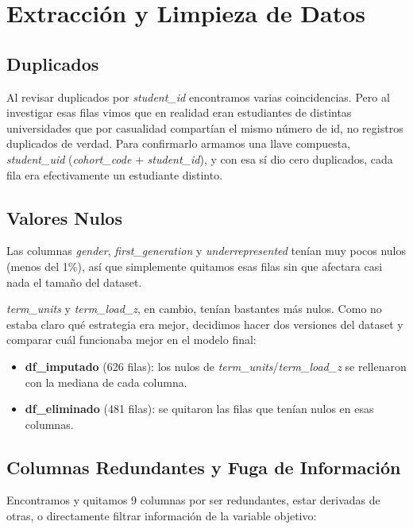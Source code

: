 \documentclass[10pt,twocolumn]{article}
\begin{document}
\section{Extracción y Limpieza de Datos}

\subsection{Duplicados}

Al revisar duplicados por \textit{student\_id} encontramos varias coincidencias. Pero al investigar esas filas vimos que en realidad eran estudiantes de distintas universidades que por casualidad compartían el mismo número de id, no registros duplicados de verdad. Para confirmarlo armamos una llave compuesta, \textit{student\_uid} (\textit{cohort\_code} + \textit{student\_id}), y con esa sí dio cero duplicados, cada fila era efectivamente un estudiante distinto.

\subsection{Valores Nulos}

Las columnas \textit{gender}, \textit{first\_generation} y \textit{underrepresented} tenían muy pocos nulos (menos del 1\%), así que simplemente quitamos esas filas sin que afectara casi nada el tamaño del dataset.

\textit{term\_units} y \textit{term\_load\_z}, en cambio, tenían bastantes más nulos. Como no estaba claro qué estrategia era mejor, decidimos hacer dos versiones del dataset y comparar cuál funcionaba mejor en el modelo final:

\begin{itemize}
  \setlength\itemsep{0.1em}
  \item \textbf{df\_imputado} (626 filas): los nulos de \textit{term\_units}/\textit{term\_load\_z} se rellenaron con la mediana de cada columna.
  \item \textbf{df\_eliminado} (481 filas): se quitaron las filas que tenían nulos en esas columnas.
\end{itemize}

\subsection{Columnas Redundantes y Fuga de Información}

Encontramos y quitamos 9 columnas por ser redundantes, estar derivadas de otras, o directamente filtrar información de la variable objetivo:
\end{document}
